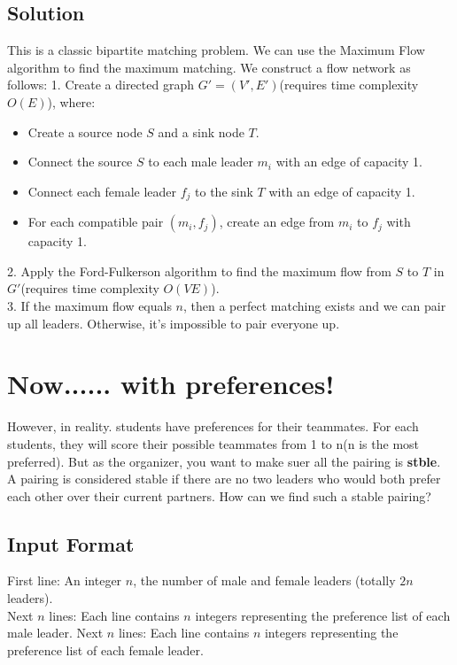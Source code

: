 \documentclass[a4paper,12pt]{article}
\begin{document}
\subsection{Solution} 
This is a classic bipartite matching problem. We can use the Maximum Flow algorithm to find the maximum matching.
We construct a flow network as follows:
1. Create a directed graph $G' = (V', E')$(requires time complexity $O(E)$), where:
\begin{itemize}
    \item Create a source node $S$ and a sink node $T$.
    \item Connect the source $S$ to each male leader $m_i$ with an edge of capacity 1.
    \item Connect each female leader $f_j$ to the sink $T$ with an edge of capacity 1.
    \item For each compatible pair $(m_i, f_j)$, create an edge from $m_i$ to $f_j$ with capacity 1.
\end{itemize}
2. Apply the Ford-Fulkerson algorithm to find the maximum flow from $S$ to $T$ in $G'$(requires time complexity $O(VE)$).\\
3. If the maximum flow equals $n$, then a perfect matching exists
and we can pair up all leaders. Otherwise, it's impossible to pair everyone up.

\section{Now...... with preferences!}
However, in reality. students have preferences for their teammates. For each students,
they will score their possible teammates from 1 to n(n is the most preferred).
But as the organizer, you want to make suer all the pairing is \textbf{stble}.
A pairing is considered stable if there are no two leaders who would both prefer each other over their current partners.
How can we find such a stable pairing?
\subsection{Input Format}
First line: An integer $n$, the number of male and female leaders (totally $2n$ leaders).\\
Next $n$ lines: Each line contains $n$ integers representing the preference list of each male leader. 
Next $n$ lines: Each line contains $n$ integers representing the preference list of each female leader.
\end{document}
